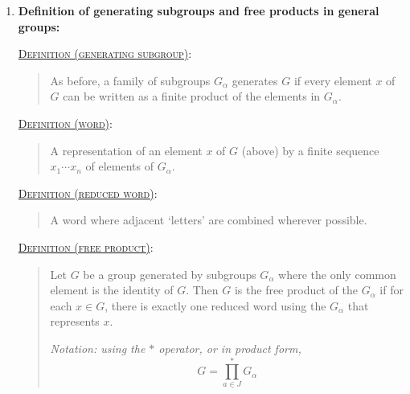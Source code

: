 \documentclass[letterpaper, 12pt]{article}
\newcommand{\defn}[2]{\textsc{\underline{Definition (#1)}:}\begin{quote} #2\end{quote}}
\begin{document}
\begin{enumerate}[resume]
            \defn{free abelian group; basis}{If $G$ is generated by $\{G_\alpha\}$ where each $G_\alpha$ is infinite cyclic with $a_\alpha$ as the generator, then $G$ is a free abelian group with $\{a_\alpha\}$ as a basis.}

            \defn{rank}{The rank of a free abelian group $G$ with a finite basis is the number of elements in any basis for $G$.

            \textit{Rank is well-defined because of the following properties. Essentially, the rank is independent of the basis.}}

            \textbf{Properties:}
                \begin{enumerate}
                \item (Extension condition: free abelian group iff any homomorphisms are extensible) Let $G$ be an abelian group and $\{a_\alpha\}$ be a generating set of $G$. Then $G$ is a free abelian group if and only if for any abelian $H$ and any subset $\{y_\alpha\}$ of $H$, there exists a homomorphism $h: G\to H$ such that $h(a_\alpha) = y_\alpha$. For such $h$, $h$ is unique.
                \item (Rank is unique) If $G$ is a free abelian group with basis $\{a_1, \dots, a_n\}$, then $n$ is uniquely determined by $G$.
                \end{enumerate}
        \item \textbf{Definition of generating subgroups and free products in general groups:}

            \defn{generating subgroup}{As before, a family of subgroups $G_\alpha$ generates $G$ if every element $x$ of $G$ can be written as a finite product of the elements in $G_\alpha$.}

            \defn{word}{A representation of an element $x$ of $G$ (above) by a finite sequence $x_1\cdots x_n$ of elements of $G_\alpha$.}

            \defn{reduced word}{A word where adjacent `letters' are combined wherever possible.}

            \defn{free product}{Let $G$ be a group generated by subgroups $G_\alpha$ where the only common element is the identity of $G$. Then $G$ is the free product of the $G_\alpha$ if for each $x\in G$, there is exactly one reduced word using the $G_\alpha$ that represents $x$.

            \textit{Notation: using the $*$ operator, or in product form, \[
                G = \prod_{a\in J}^* G_\alpha
            \]}

}
\end{enumerate}
\end{document}
